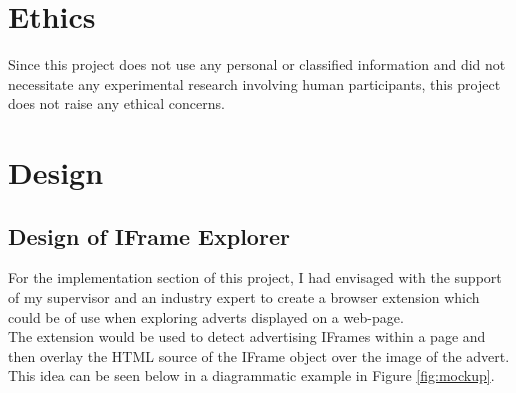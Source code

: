 \documentclass[12pt]{article}
\begin{document}
\section{Ethics}
Since this project does not use any personal or classified information and did not necessitate any experimental research involving human participants, this project does not raise any ethical concerns. 

\pagebreak

\section{Design} \label{design}

\subsection{Design of IFrame Explorer}
For the implementation section of this project, I had envisaged with the support of my supervisor and an industry expert to create a browser extension which could be of use when exploring adverts displayed on a web-page.  \\

The extension would be used to detect advertising IFrames within a page and then overlay the HTML source of the IFrame object over the image of the advert. This idea can be seen below in a diagrammatic example in Figure \ref{fig:mockup}. 
\end{document}
